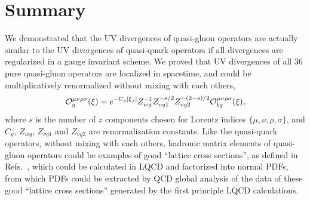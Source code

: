 \section{Summary}
We demonstrated that the UV divergences of quasi-gluon operators are actually similar to the UV divergences of quasi-quark operators if all divergences are regularized in a gauge invariant scheme.  We proved that UV divergences of all 36 pure quasi-gluon operators are localized in spacetime, and could be multiplicatively renormalized without mixing with each others,
\begin{align}
{\cal O}_{g}^{\mu \nu \rho\sigma}(\xi)=e^{-C_g |\xi_z|}Z_{wg}^{-1}Z_{vg1}^{-s/2}Z_{vg2}^{-(2-s)/2}{\cal O}_{bg}^{\mu \nu \rho\sigma}(\xi),
\end{align}
where $s$ is the number of $z$ components chosen for Lorentz indices $\{ \mu,\nu,\rho,\sigma\}$, and $C_g$, $Z_{wg}$, $Z_{vg1}$ and $Z_{vg2}$ are renormalization constants.
Like the quasi-quark operators, without mixing with each others, hadronic matrix elements of quasi-gluon operators could be examples of good ``lattice cross sections'', as defined in Refs.~\cite{Ma:2014jla,Ma:2017pxb}, which could be calculated in LQCD and factorized into normal PDFs, from which PDFs could be extracted by QCD global analysis of the data of these good ``lattice cross sections'' generated by the first principle LQCD calculations.
